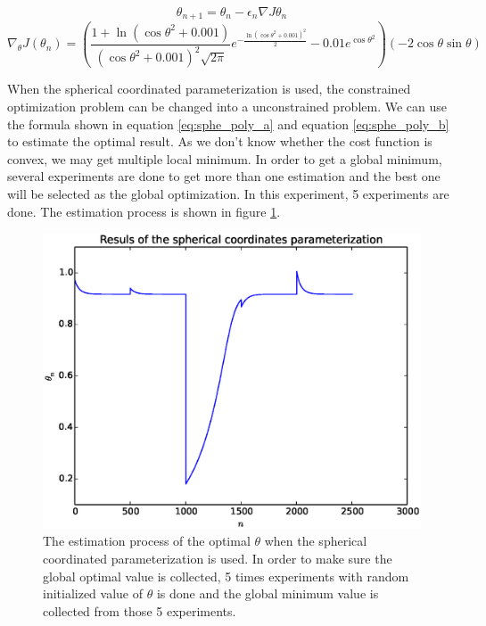 \documentclass[a4paper,12pt]{article}
\begin{document}
\begin{equation} \label{eq:sphe_poly_a}
\theta_{n+1}=\theta_n-\epsilon _n \nabla J{\theta_ n}
\end{equation}
\begin{equation}\label{eq:sphe_poly_b}
\nabla _{\theta} J(\theta_n) = (\frac{1+\ln( \cos \theta ^2+0.001)}{( \cos \theta ^2+0.001)^2 \sqrt{2 \pi}}e^{-\frac{\ln( \cos \theta ^2+0.001)^2}{2} }  -0.01 e^ {\cos \theta ^2})(-2 \cos \theta \sin \theta)
\end{equation}

When the spherical coordinated parameterization is used, the constrained optimization problem can be changed into a unconstrained problem. We can use the formula shown in equation \ref{eq:sphe_poly_a} and equation \ref{eq:sphe_poly_b} to estimate the optimal result. As we don't know whether the cost function is convex, we may get multiple local minimum. In order to get a global minimum, several experiments are done to get more than one estimation and the best one will be selected as the global optimization. In this experiment, 5 experiments are done. The estimation process is  shown in figure \ref{fig:polynomial_est_res_sphe}.\\



\begin{figure}[H]
\begin{center}
\includegraphics[width=1.0\linewidth]{exp_est_sphe.eps}



\end{center}
   \caption{The estimation process of the optimal $\theta$ when the spherical coordinated parameterization is used. In order to make sure the global optimal value is collected, 5 times experiments with random initialized value of $\theta$ is done and the global minimum value is collected from those 5 experiments.}
\label{fig:polynomial_est_res_sphe}
\end{figure}
\end{document}
